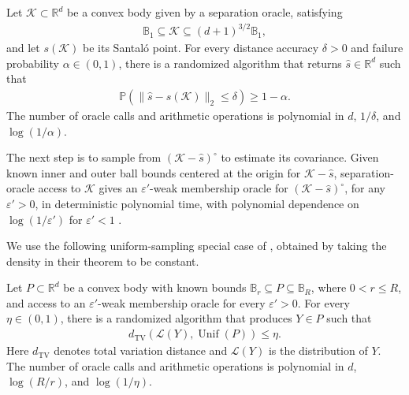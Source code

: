 \documentclass[12pt,cleveref]{jmlr}
\newcommand{\R}{\mathbb R}
\newcommand{\Pp}{\mathbb P}
\newcommand{\K}{\mathcal K}
\newcommand{\1}{\mathbf 1}
\renewcommand{\epsilon}{\varepsilon}
\begin{document}
\begin{theorem}
    \label{thm:santalo}
    Let $\K\subset\R^d$ be a convex body given by a separation oracle,
    satisfying
    \begin{align}
        \mathbb B_1\subseteq\K\subseteq(d+1)^{3/2}\mathbb B_1,
    \end{align}
    and let $s(\K)$ be its Santal\'o point. For every distance accuracy
    $\delta>0$ and failure probability $\alpha\in(0,1)$, there is a
    randomized algorithm that returns $\hat s\in\R^d$ such that
    \begin{align}
        \Pp\left(\|\hat s-s(\K)\|_2\leq\delta\right)\geq1-\alpha.
    \end{align}
    The number of oracle calls and arithmetic operations is polynomial
    in $d$, $1/\delta$, and $\log(1/\alpha)$.
\end{theorem}

The next step is to sample from $(\K-\hat s)^\circ$ to estimate its
covariance. Given known inner and outer ball bounds centered at the origin
for $\K-\hat s$, separation-oracle access to $\K$ gives an
$\epsilon'$-weak membership oracle for $(\K-\hat s)^\circ$, for any
$\epsilon'>0$, in deterministic polynomial time, with polynomial
dependence on $\log(1/\epsilon')$ for $\epsilon'<1$
\citep[Theorem~4.2.2 and Lemma~4.4.1]{grotschel1988geometric}.

We use the following uniform-sampling special case of
\citet[Theorem~B.6(1)]{dadush2011enumerative}, obtained by taking the
density in their theorem to be constant.

\begin{lemma}
    \label{lem:uniform-sampling}
    Let $P\subset\R^d$ be a convex body with known bounds
    $\mathbb B_r\subseteq P\subseteq\mathbb B_R$, where $0<r\leq R$,
    and access to an $\epsilon'$-weak membership oracle for every
    $\epsilon'>0$. For every $\eta\in(0,1)$, there is a randomized
    algorithm that produces $Y\in P$ such that
    \begin{align}
        d_{\mathrm{TV}}\!\left(\mathcal L(Y),\operatorname{Unif}(P)\right)
        \leq\eta.
    \end{align}
    Here $d_{\mathrm{TV}}$ denotes total variation distance and
    $\mathcal L(Y)$ is the distribution of $Y$. The number of oracle
    calls and arithmetic operations is polynomial in $d$, $\log(R/r)$,
    and $\log(1/\eta)$.
\end{lemma}
\end{document}
